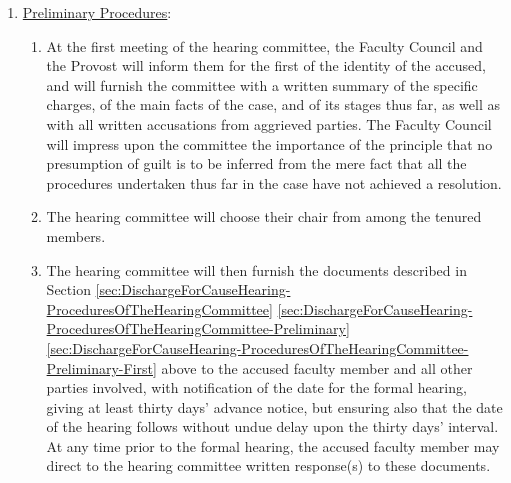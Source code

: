 					\begin{enumerate}[label=\alph*)]
						\item{\underline{Preliminary Procedures}:
							\label{sec:DischargeForCauseHearing-ProceduresOfTheHearingCommittee-Preliminary}
							\begin{enumerate}[label=\arabic*)]
								\item{
									\label{sec:DischargeForCauseHearing-ProceduresOfTheHearingCommittee-Preliminary-First}
									At the first meeting of the hearing committee, the Faculty Council and the Provost will inform them for the first of the identity of the accused, and will furnish the committee with a written summary of the specific charges, of the main facts of the case, and of its stages thus far, as well as with all written accusations from aggrieved parties. The Faculty Council will impress upon the committee the importance of the principle that no presumption of guilt is to be inferred from the mere fact that all the procedures undertaken thus far in the case have not achieved a resolution.}
								\item{The hearing committee will choose their chair from among the tenured members.}

								\item{The hearing committee will then furnish the documents described in
									Section
									\ref{sec:DischargeForCauseHearing-ProceduresOfTheHearingCommittee}
									\ref{sec:DischargeForCauseHearing-ProceduresOfTheHearingCommittee-Preliminary}
									\ref{sec:DischargeForCauseHearing-ProceduresOfTheHearingCommittee-Preliminary-First}
									above to the accused faculty member and all other parties involved, with notification of the date for the formal hearing, giving at least thirty days' advance notice, but ensuring also that the date of the hearing follows without undue delay upon the thirty days' interval.  At any time prior to the formal hearing, the accused faculty member may direct to the hearing committee written response(s) to these documents.}


\end{enumerate}}
\end{enumerate}
